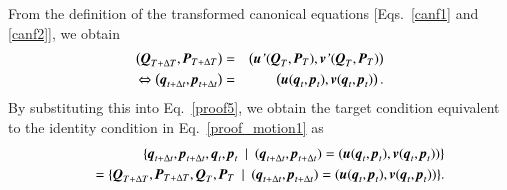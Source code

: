 \documentclass[preprint,
bibnotes,
 amsmath,amssymb,
 aps,
]{revtex4-1}
\newcounter{num}
\begin{document}
From the definition of the transformed canonical equations [Eqs.~\eqref{canf1} and \eqref{canf2}], we obtain 
\begin{eqnarray}
\left(\textit{\textbf{Q}}_{T+\Delta T},\textit{\textbf{P}}_{T+\Delta T}\right) &=& \left(\textit{\textbf{u}'}(\textit{\textbf{Q}}_{T},\textit{\textbf{P}}_{T}),\textit{\textbf{v}'}(\textit{\textbf{Q}}_{T},\textit{\textbf{P}}_{T})\right)\\
\Leftrightarrow\left(\textit{\textbf{q}}_{t+\Delta t},\textit{\textbf{p}}_{t+\Delta t}\right) &=& \left(\textit{\textbf{u}}(\textit{\textbf{q}}_{t},\textit{\textbf{p}}_{t}),\textit{\textbf{v}}(\textit{\textbf{q}}_{t},\textit{\textbf{p}}_{t})\right).
\end{eqnarray}
By substituting this into Eq.~\eqref{proof5}, we obtain the target condition equivalent to the identity condition in Eq.~\eqref{proof_motion1} as
\begin{eqnarray}
&\:&
\{\textit{\textbf{q}}_{t+\Delta t},\textit{\textbf{p}}_{t+\Delta t},\textit{\textbf{q}}_{t},\textit{\textbf{p}}_{t}\:\mid \: (\textit{\textbf{q}}_{t+\Delta t},\textit{\textbf{p}}_{t+\Delta t}) = (\textit{\textbf{u}}(\textit{\textbf{q}}_{t},\textit{\textbf{p}}_{t}),\textit{\textbf{v}}(\textit{\textbf{q}}_{t},\textit{\textbf{p}}_{t}))\}\nonumber\\
&\:&\:= \{\textit{\textbf{Q}}_{T+\Delta T},\textit{\textbf{P}}_{T+\Delta T},\textit{\textbf{Q}}_{T},\textit{\textbf{P}}_{T}\:\mid \: (\textit{\textbf{q}}_{t+\Delta t},\textit{\textbf{p}}_{t+\Delta t}) = (\textit{\textbf{u}}(\textit{\textbf{q}}_{t},\textit{\textbf{p}}_{t}),\textit{\textbf{v}}(\textit{\textbf{q}}_{t},\textit{\textbf{p}}_{t}))\}.
\end{eqnarray}
\end{document}
